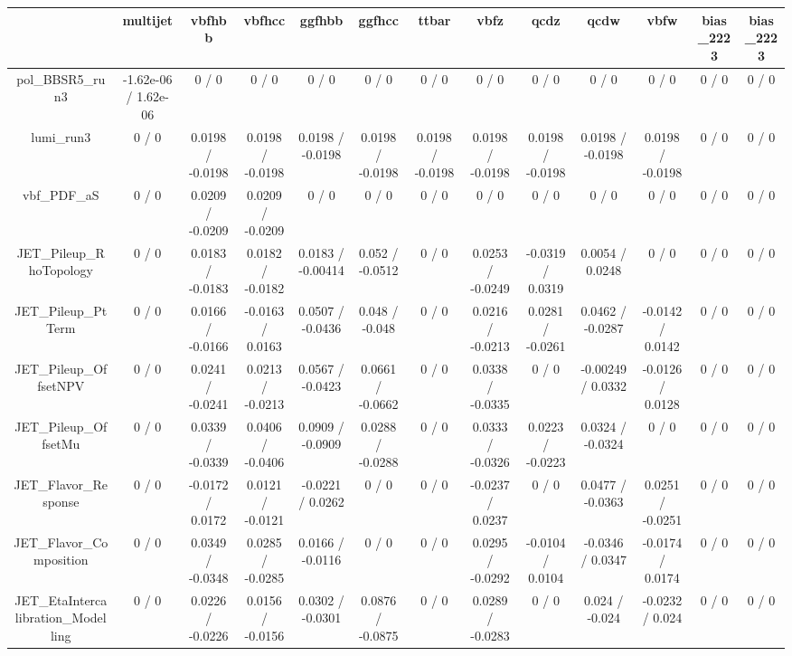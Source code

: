 \documentclass[10pt]{article}
\begin{document}
\begin{table}[htbp]
\begin{center}
\begin{tabular}{|c|c|c|c|c|c|c|c|c|c|c|c|c|}
\hline 
      & multijet      & vbfhbb      & vbfhcc      & ggfhbb      & ggfhcc      & ttbar      & vbfz      & qcdz      & qcdw      & vbfw      & bias_2223      & bias_2223 \\ 
\hline 
  pol_BBSR5_run3 & -1.62e-06 / 1.62e-06 & 0 / 0 & 0 / 0 & 0 / 0 & 0 / 0 & 0 / 0 & 0 / 0 & 0 / 0 & 0 / 0 & 0 / 0 & 0 / 0 & 0 / 0 \\ 
  lumi_run3 & 0 / 0 & 0.0198 / -0.0198 & 0.0198 / -0.0198 & 0.0198 / -0.0198 & 0.0198 / -0.0198 & 0.0198 / -0.0198 & 0.0198 / -0.0198 & 0.0198 / -0.0198 & 0.0198 / -0.0198 & 0.0198 / -0.0198 & 0 / 0 & 0 / 0 \\ 
  vbf_PDF_aS & 0 / 0 & 0.0209 / -0.0209 & 0.0209 / -0.0209 & 0 / 0 & 0 / 0 & 0 / 0 & 0 / 0 & 0 / 0 & 0 / 0 & 0 / 0 & 0 / 0 & 0 / 0 \\ 
  JET_Pileup_RhoTopology & 0 / 0 & 0.0183 / -0.0183 & 0.0182 / -0.0182 & 0.0183 / -0.00414 & 0.052 / -0.0512 & 0 / 0 & 0.0253 / -0.0249 & -0.0319 / 0.0319 & 0.0054 / 0.0248 & 0 / 0 & 0 / 0 & 0 / 0 \\ 
  JET_Pileup_PtTerm & 0 / 0 & 0.0166 / -0.0166 & -0.0163 / 0.0163 & 0.0507 / -0.0436 & 0.048 / -0.048 & 0 / 0 & 0.0216 / -0.0213 & 0.0281 / -0.0261 & 0.0462 / -0.0287 & -0.0142 / 0.0142 & 0 / 0 & 0 / 0 \\ 
  JET_Pileup_OffsetNPV & 0 / 0 & 0.0241 / -0.0241 & 0.0213 / -0.0213 & 0.0567 / -0.0423 & 0.0661 / -0.0662 & 0 / 0 & 0.0338 / -0.0335 & 0 / 0 & -0.00249 / 0.0332 & -0.0126 / 0.0128 & 0 / 0 & 0 / 0 \\ 
  JET_Pileup_OffsetMu & 0 / 0 & 0.0339 / -0.0339 & 0.0406 / -0.0406 & 0.0909 / -0.0909 & 0.0288 / -0.0288 & 0 / 0 & 0.0333 / -0.0326 & 0.0223 / -0.0223 & 0.0324 / -0.0324 & 0 / 0 & 0 / 0 & 0 / 0 \\ 
  JET_Flavor_Response & 0 / 0 & -0.0172 / 0.0172 & 0.0121 / -0.0121 & -0.0221 / 0.0262 & 0 / 0 & 0 / 0 & -0.0237 / 0.0237 & 0 / 0 & 0.0477 / -0.0363 & 0.0251 / -0.0251 & 0 / 0 & 0 / 0 \\ 
  JET_Flavor_Composition & 0 / 0 & 0.0349 / -0.0348 & 0.0285 / -0.0285 & 0.0166 / -0.0116 & 0 / 0 & 0 / 0 & 0.0295 / -0.0292 & -0.0104 / 0.0104 & -0.0346 / 0.0347 & -0.0174 / 0.0174 & 0 / 0 & 0 / 0 \\ 
  JET_EtaIntercalibration_Modelling & 0 / 0 & 0.0226 / -0.0226 & 0.0156 / -0.0156 & 0.0302 / -0.0301 & 0.0876 / -0.0875 & 0 / 0 & 0.0289 / -0.0283 & 0 / 0 & 0.024 / -0.024 & -0.0232 / 0.024 & 0 / 0 & 0 / 0 \\ 

\end{tabular}
\end{center}
\end{table}
\end{document}
